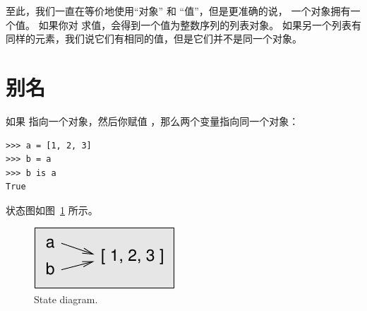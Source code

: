 
至此，我们一直在等价地使用``对象'' 和 ``值''，但是更准确的说， 一个对象拥有一个值。 如果你对 \li{[1, 2, 3]} 求值，会得到一个值为整数序列的列表对象。
如果另一个列表有同样的元素，我们说它们有相同的值，但是它们并不是同一个对象。

  


\section{别名}
  


如果  指向一个对象，然后你赋值  ，那么两个变量指向同一个对象：

\begin{lstlisting}
>>> a = [1, 2, 3]
>>> b = a
>>> b is a
True
\end{lstlisting}

%

状态图如图~\ref{fig.list3} 所示。

  

\begin{figure}
\centerline
{\includegraphics[scale=0.8]{../source/figs/list3.pdf}}
\caption{State diagram.}
\label{fig.list3}
\end{figure}


